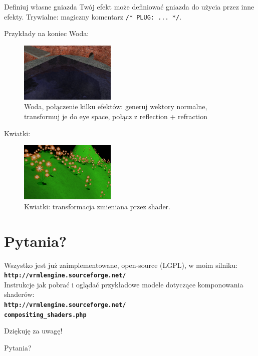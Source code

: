 \documentclass{beamer}
\begin{document}
\begin{frame}{Definiuj własne gniazda}
Twój efekt może definiować gniazda do użycia przez inne efekty.
Trywialne: magiczny komentarz \texttt{/* PLUG: ... */}.
\end{frame}

\begin{frame}{Przykłady na koniec}
Woda:

\begin{figure}
  \centering
  \includegraphics[width=1.8in]{../water_shaders_3}
  \caption{Woda, połączenie kilku efektów: generuj wektory normalne, transformuj je do eye space, połącz z reflection + refraction}
\end{figure}

Kwiatki:

\begin{figure}
  \centering
  \includegraphics[width=1.8in]{../flowers}
  \caption{Kwiatki: transformacja zmieniana przez shader.}
\end{figure}
\end{frame}

\section{Pytania?}

\begin{frame}[t]

\begin{center}
{\small
Wszystko jest już zaimplementowane, open-source (LGPL), w moim silniku:\\
{\color{blue} \textbf{\texttt{http://vrmlengine.sourceforge.net/}}}\\
Instrukcje jak pobrać i oglądać przykładowe modele dotyczące komponowania
shaderów:\\
{\color{blue} \textbf{\texttt{http://vrmlengine.sourceforge.net/\\
compositing\_shaders.php}}}}
\end{center}

\vspace{0.25in}

\begin{center}
{\Large Dziękuję za uwagę!}
\end{center}


\begin{center}
{\Huge \alert{Pytania?}}
\end{center}

\end{frame}
\end{document}
